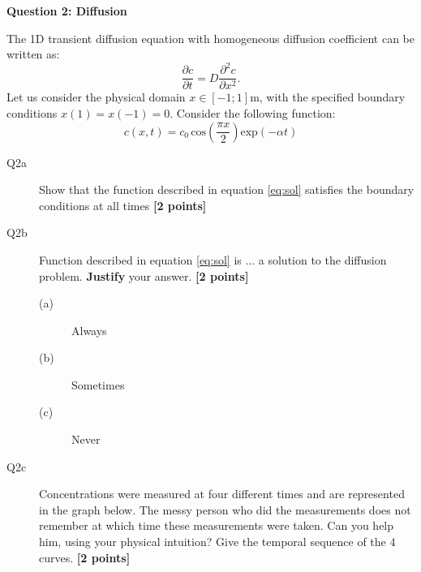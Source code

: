 \documentclass{article}
\begin{document}
\textbf{Question 2: Diffusion}

The 1D transient diffusion equation with homogeneous diffusion coefficient can be written as:
\begin{equation}
\frac{\partial c}{\partial t} = D \frac{\partial^2 c}{\partial x^2}. \label{eq:diff}
\end{equation} Let us consider the physical domain $ x \in \left[ -1 ; 1 \right] \mathrm{m}$, with the specified boundary conditions $x(1) = x(-1) = 0$. Consider the following function:
\begin{equation}
c(x,t) = c_0 \, \mathrm{cos}\left(\frac{\pi x}{2} \right) \mathrm{exp}\left(-\alpha t \right)  \label{eq:sol}
\end{equation}



\begin{description}
\item [Q2a] Show that the function described in equation \ref{eq:sol} satisfies the boundary conditions at all times \textbf{[2 points]}
\vspace{2cm}

\item [Q2b] Function described in equation \ref{eq:sol} is ... a solution to the diffusion problem. \textbf{Justify} your answer. \textbf{[2 points]}
\begin{description}
	\item [(a)] Always
	\item [(b)] Sometimes
	\item [(c)] Never
\end{description}
\vspace{3cm}





\item [Q2c] Concentrations were measured at four different times and are represented in the graph below. The messy person who did the measurements does not remember at which time these measurements were taken. Can you help him, using your physical intuition? Give the temporal sequence of the 4 curves.  \textbf{[2 points]}
\end{description}

\end{document}
